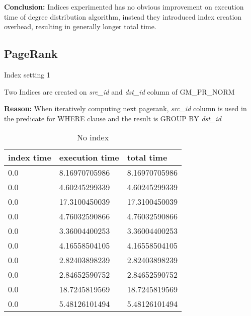 \par \textbf{Conclusion:} Indices experimented has no obvious improvement on execution time of degree distribution algorithm, instead they introduced index creation overhead, resulting in generally longer total time.

\subsection{PageRank}
\begin{itemize*}
\item{Index setting 1}
\par Two Indices are created on \textit{src\_id} and \textit{dst\_id} column of GM\_PR\_NORM
\par \textbf{Reason:} When iteratively computing next pagerank, \textit{src\_id} column is used in the predicate for WHERE clause and the result is GROUP BY \textit{dst\_id}

\begin{table}[H]
\begin{center}
\begin{tabular}{|l|l|l|}
\hline
index time & execution time & total time     \\ \hline
0.0 & 8.16970705986 & 8.16970705986 \\ \hline
0.0 & 4.60245299339 & 4.60245299339 \\ \hline
0.0 & 17.3100450039 & 17.3100450039 \\ \hline
0.0 & 4.76032590866 & 4.76032590866 \\ \hline
0.0 & 3.36004400253 & 3.36004400253 \\ \hline
0.0 & 4.16558504105 & 4.16558504105 \\ \hline
0.0 & 2.82403898239 & 2.82403898239 \\ \hline
0.0 & 2.84652590752 & 2.84652590752 \\ \hline
0.0 & 18.7245819569 & 18.7245819569 \\ \hline
0.0 & 5.48126101494 & 5.48126101494 \\ \hline
\end{tabular}
\end{center}
\caption{No index}
\end{table}


\end{itemize*}
